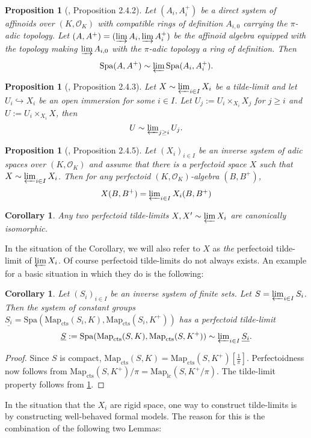 \documentclass[10pt,oneside]{amsart}
\newtheorem{proposition}[theorem]{Proposition}
\newtheorem{corollary}[theorem]{Corollary}
\theoremstyle{definition}
\begin{document}
\begin{proposition}[\cite{SW}, Proposition 2.4.2]\label{SW Proposition 2.4.2}
	Let $(A_i,A_i^{+})$ be a direct system of affinoids over $(K,\mathcal O_K)$ with compatible rings of definition $A_{i,0}$ carrying the $\pi$-adic topology. Let $(A,A^{+})=(\varinjlim A_i,\varinjlim A_i^{+})$ be the affinoid algebra equipped with the topology making $\varinjlim A_{i,0}$ with the $\pi$-adic topology a ring of definition. Then
	\[\operatorname{Spa}(A,A^{+})\sim \textstyle\varprojlim \operatorname{Spa}(A_i,A_i^{+}).\]
\end{proposition}
\begin{proposition}[\cite{SW}, Proposition 2.4.3]\label{SW Proposition 2.4.3}
	Let $X\sim \varprojlim_{i\in I} X_i$ be a tilde-limit and let $U_i\hookrightarrow X_i$ be an open immersion for some $i\in I$. Let $U_j:=U_i\times_{X_i}X_j$ for $j\geq i$ and $U:=U_i\times_{X_i}X$, then 
	\[U\sim \textstyle\varprojlim_{j\geq i} U_j.\]
\end{proposition}

\begin{proposition}[\cite{SW}, Proposition 2.4.5]\label{SW Proposition 2.4.5}
	Let $(X_i)_{i\in I}$ be an inverse system of adic spaces over $(K,\mathcal O_K)$ and assume that there is a perfectoid space $X$ such that $X\sim \varprojlim_{i\in I} X_i$. Then for any perfectoid $(K,\mathcal O_K)$-algebra $(B,B^{+})$, 
	\[X(B,B^{+})  = \textstyle\varprojlim_{i\in I}X_i(B,B^{+})\]
\end{proposition}
\begin{corollary}\label{corollary: perfectoid tilde limit is unique}
	Any two perfectoid tilde-limits $X,X'\sim \varprojlim X_i$ are canonically isomorphic.
\end{corollary}
In the situation of the Corollary, we will also refer to $X$ as \textit{the} perfectoid tilde-limit of $\varprojlim X_i$. Of course perfectoid tilde-limits do not always exists. An example for a basic situation in which they do is the following:
\begin{corollary}\label{pro-finite-perfectoid-spaces}
	Let $(S_i)_{i\in I}$ be an inverse system of finite sets. Let $S=\varprojlim_{i\in I} S_i$. Then the system of constant groups $\underline{S_i}=\mathrm{Spa}(\mathrm{Map}_{\mathrm{cts}}(S_i,K),\mathrm{Map}_{\mathrm{cts}}(S_i,K^+))$ has a perfectoid tilde-limit	\[\underline{S}:=\mathrm{Spa}(\mathrm{Map}_{\mathrm{cts}}(S,K),\mathrm{Map}_{\mathrm{cts}}(S,K^+))\sim\textstyle\varprojlim_{i\in I} \underline{S_i}.\]
\end{corollary}
\begin{proof}
	Since $S$ is compact, $\mathrm{Map}_{\mathrm{cts}}(S,K)=\mathrm{Map}_{\mathrm{cts}}(S,K^+)[\tfrac{1}{\pi}]$. Perfectoidness now follows from $\mathrm{Map}_{\mathrm{cts}}(S,K^+)/\pi=\mathrm{Map}_{\mathrm{lc}}(S,K^+/\pi)$. The tilde-limit property follows from \ref{SW Proposition 2.4.2}.
\end{proof}
In the situation that the $X_i$ are rigid space, one way to construct tilde-limits is by constructing well-behaved formal models. The reason for this is the combination of the following two Lemmas:
\end{document}
